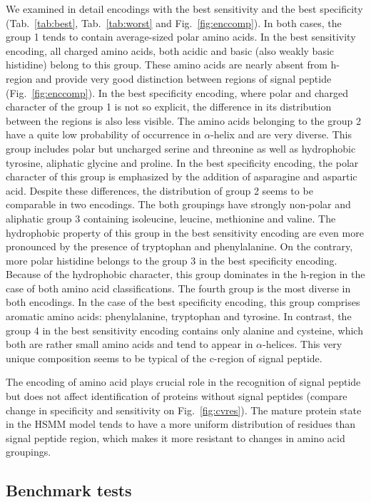 \documentclass[10pt,letterpaper]{article}
\begin{document}
We examined in detail encodings with the best sensitivity and the best specificity (Tab.~\ref{tab:best}, Tab.~\ref{tab:worst} and Fig.~\ref{fig:enccomp}). In both cases, the group 1 tends to contain average-sized polar amino acids. In the best sensitivity encoding, all charged amino acids, both acidic and basic (also weakly basic histidine)   belong to this group. These amino acids are nearly absent from h-region and provide very good distinction between regions of signal peptide (Fig.~\ref{fig:enccomp}). In the best specificity encoding, where polar and charged character of the group 1 is not so explicit, the difference in its distribution between the regions is also less visible.
The amino acids belonging to the group 2 have a quite low probability of occurrence in $\alpha$-helix and are very diverse. This group includes polar but uncharged serine and threonine as well as hydrophobic tyrosine, aliphatic glycine and proline. In the best specificity encoding, the polar character of this group is emphasized by the addition of asparagine and aspartic acid. Despite these differences, the distribution of group 2 seems to be comparable in two encodings. The both groupings have strongly non-polar and aliphatic group 3 containing isoleucine, leucine, methionine and valine. The hydrophobic property of this group in the best sensitivity encoding are even more pronounced by the presence of tryptophan and phenylalanine. On the contrary, more polar histidine belongs to the group 3 in the best specificity encoding. Because of the hydrophobic character, this group dominates in the h-region in the case of both amino acid classifications.
The fourth group is the most diverse in both encodings. In the case of the best specificity encoding, this group comprises aromatic amino acids: phenylalanine, tryptophan and tyrosine. In contrast, the group 4 in the best sensitivity encoding contains only alanine and cysteine, which both are rather small amino acids and tend to appear in $\alpha$-helices. This very unique composition seems to be typical of the c-region of signal peptide.

The encoding of amino acid plays crucial role in the recognition of signal peptide but does not affect identification of proteins without signal peptides (compare change in specificity and sensitivity on Fig.~\ref{fig:cvres}). The mature protein state in the HSMM model tends to have a more uniform distribution of residues than signal peptide region, which makes it more resistant to changes in amino acid groupings.

\subsection*{Benchmark tests}
\end{document}
